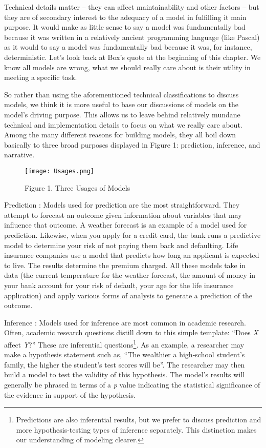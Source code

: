\documentclass[]{memoir}
\let\Oldincludegraphics\includegraphics
\renewcommand{\includegraphics}[1]{\Oldincludegraphics[max size={\textwidth}{\textheight}]{#1}}
\begin{document}
Technical details matter -- they can affect maintainability and other
factors -- but they are of secondary interest to the adequacy of a model
in fulfilling it main purpose. It would make as little sense to say a
model was fundamentally bad because it was written in a relatively
ancient programming language (like Pascal) as it would to say a model
was fundamentally bad because it was, for instance, deterministic. Let's
look back at Box's quote at the beginning of this chapter. We know all
models are wrong, what we should really care about is their utility in
meeting a specific task.

So rather than using the aforementioned technical classifications to
discuss models, we think it is more useful to base our discussions of
models on the model's driving purpose. This allows us to leave behind
relatively mundane technical and implementation details to focus on what
we really care about. Among the many different reasons for building
models, they all boil down basically to three broad purposes displayed
in Figure 1: prediction, inference, and narrative.

\begin{figure}[htbp]
\centering
\texttt{[image: Usages.png]}
\caption{Figure 1. Three Usages of Models}
\end{figure}

Prediction : Models used for prediction are the most straightforward.
They attempt to forecast an outcome given information about variables
that may influence that outcome. A weather forecast is an example of a
model used for prediction. Likewise, when you apply for a credit card,
the bank runs a predictive model to determine your risk of not paying
them back and defaulting. Life insurance companies use a model that
predicts how long an applicant is expected to live. The results
determine the premium charged. All these models take in data (the
current temperature for the weather forecast, the amount of money in
your bank account for your risk of default, your age for the life
insurance application) and apply various forms of analysis to generate a
prediction of the outcome.

Inference : Models used for inference are most common in academic
research. Often, academic research questions distill down to this simple
template: ``Does \emph{X} affect \emph{Y}?'' These are inferential
questions\footnote{Predictions are also inferential results, but we
  prefer to discuss prediction and more hypothesis-testing types of
  inference separately. This distinction makes our understanding of
  modeling clearer.}. As an example, a researcher may make a hypothesis
statement such as, ``The wealthier a high-school student's family, the
higher the student's test scores will be''. The researcher may then
build a model to test the validity of this hypothesis. The model's
results will generally be phrased in terms of a \emph{p} value
indicating the statistical significance of the evidence in support of
the hypothesis.
\end{document}
